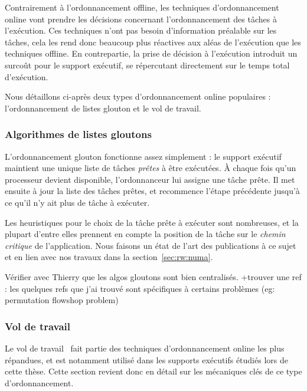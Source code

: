 Contrairement à l'ordonnancement offline, les techniques d'ordonnancement online vont prendre les décisions concernant l'ordonnancement des tâches à l'exécution.
Ces techniques n'ont pas besoin d'information préalable sur les tâches, cela les rend donc beaucoup plus réactives aux aléas de l'exécution que les techniques offline.
En contrepartie, la prise de décision à l'exécution introduit un surcoût pour le support exécutif, se répercutant directement sur le temps total d'exécution.


Nous détaillons ci-après deux types d'ordonnancement online populaires : l'ordonnancement de listes glouton et le vol de travail.

\subsubsection{Algorithmes de listes gloutons}

L'ordonnancement glouton fonctionne assez simplement : le support exécutif maintient une unique liste de tâches \emph{prêtes} à être exécutées.
À chaque fois qu'un processeur devient disponible, l'ordonnanceur lui assigne une tâche prête.
Il met ensuite à jour la liste des tâches prêtes, et recommence l'étape précédente jusqu'à ce qu'il n'y ait plus de tâche à exécuter.

Les heuristiques pour le choix de la tâche prête à exécuter sont nombreuses, et la plupart d'entre elles prennent en compte la position de la tâche sur le \emph{chemin critique} de l'application.
Nous faisons un état de l'art des publications à ce sujet et en lien avec nos travaux dans la section~\ref{sec:rw:numa}.

\begin{todo}
Vérifier avec Thierry que les algos gloutons sont bien centralisés.
+trouver une ref : les quelques refs que j'ai trouvé sont spécifiques à certains problèmes (eg: permutation flowshop problem)

\end{todo}

\subsubsection{Vol de travail}\label{sec:context:runtimes:ws}

Le vol de travail~\cite{Blumofe1999} fait partie des techniques d'ordonnancement online les plus répandues, et est notamment utilisé dans les supports exécutifs étudiés lors de cette thèse.
Cette section revient donc en détail sur les mécaniques clés de ce type d'ordonnancement.

